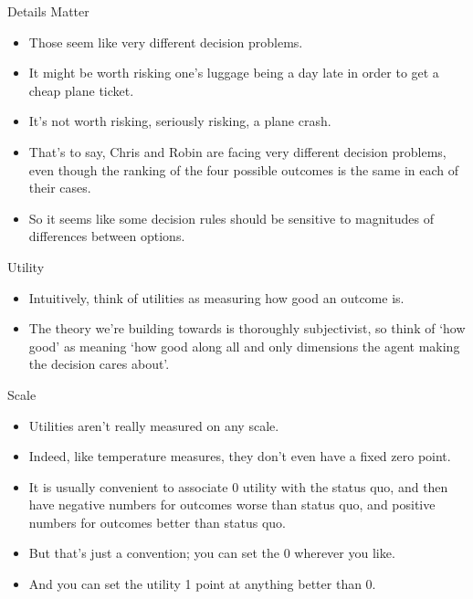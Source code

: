 \documentclass[
  ignorenonframetext,
]{beamer}
\providecommand{\tightlist}{%
  \setlength{\itemsep}{0pt}\setlength{\parskip}{0pt}}
\renewcommand{\,}{\text{, }}
\begin{document}
\begin{frame}{Details Matter}
\protect\hypertarget{details-matter}{}

\begin{itemize}
\tightlist
\item
  Those seem like very different decision problems.
\item
  It might be worth risking one's luggage being a day late in order to
  get a cheap plane ticket.
\item
  It's not worth risking, seriously risking, a plane crash.
\item
  That's to say, Chris and Robin are facing very different decision
  problems, even though the ranking of the four possible outcomes is the
  same in each of their cases.
\item
  So it seems like some decision rules should be sensitive to magnitudes
  of differences between options.
\end{itemize}

\end{frame}

\begin{frame}{Utility}
\protect\hypertarget{utility}{}

\begin{itemize}
\tightlist
\item
  Intuitively, think of utilities as measuring how good an outcome is.
\item
  The theory we're building towards is thoroughly subjectivist, so think
  of `how good' as meaning `how good along all and only dimensions the
  agent making the decision cares about'.
\end{itemize}

\end{frame}

\begin{frame}{Scale}
\protect\hypertarget{scale-1}{}

\begin{itemize}
\tightlist
\item
  Utilities aren't really measured on any scale.
\item
  Indeed, like temperature measures, they don't even have a fixed zero
  point.
\item
  It is usually convenient to associate 0 utility with the status quo,
  and then have negative numbers for outcomes worse than status quo, and
  positive numbers for outcomes better than status quo.
\item
  But that's just a convention; you can set the 0 wherever you like.
\item
  And you can set the utility 1 point at anything better than 0.
\end{itemize}

\end{frame}
\end{document}
